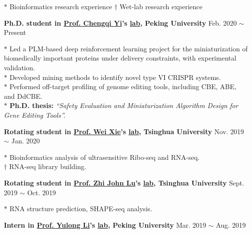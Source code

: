 
\small
$*$ Bioinformatics research experience \hspace{2em} $\dagger$ Wet-lab research experience

\normalsize
\vspace{10pt}

\textbf{Ph.D. student in \href{https://www.bio.pku.edu.cn/enhomes/news/teacher_dis/91.html}{Prof. Chengqi Yi}'s \href{https://yilab.org.cn/}{lab}, Peking University} \hfill Feb. 2020 $\sim$ Present

{\small
$*$ Led a PLM-based deep reinforcement learning project for the miniaturization of biomedically important proteins under delivery constraints, with experimental validation.\\
$*$ Developed mining methods to identify novel type VI CRISPR systems.\\
$*$ Performed off-target profiling of genome editing tools, including CBE, ABE, and DdCBE\cite{lei2022mitochondrial,rao2023characterizing,lei2021detect,lei2023detect}.\\
$*$ \textbf{Ph.D. thesis:} \textit{``Safety Evaluation and Miniaturization Algorithm Design for Gene Editing Tools''.}
}

\vspace{5pt}

\textbf{Rotating student in \href{https://life.tsinghua.edu.cn/lifeen/info/1034/1077.htm}{Prof. Wei Xie}'s \href{http://www.xielab.org.cn/}{lab}, Tsinghua University} \hfill Nov. 2019 $\sim$ Jan. 2020

{\small
$*$ Bioinformatics analysis of ultrasensitive Ribo-seq and RNA-seq.\\
$\dagger$ RNA-seq library building.
}

\vspace{5pt}

\textbf{Rotating student in \href{https://life.tsinghua.edu.cn/lifeen/info/1034/1083.htm}{Prof. Zhi John Lu}'s \href{https://lulab.life.tsinghua.edu.cn/labhome/home/}{lab}, Tsinghua University} \hfill Sept. 2019 $\sim$ Oct. 2019

{\small
$*$ RNA structure prediction\cite{zhu2021integrative}, SHAPE-seq analysis.
}


\vspace{5pt}


\textbf{Intern in \href{https://www.bio.pku.edu.cn/enhomes/news/teacher_dis/43.html}{Prof. Yulong Li}'s \href{http://www.yulonglilab.org/}{lab}, Peking University} \hfill Mar. 2019 $\sim$ Aug. 2019

